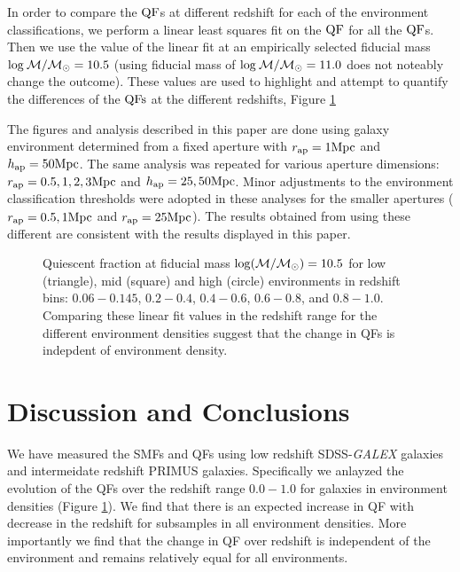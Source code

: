 \documentclass{emulateapj}
\begin{document}
In order to compare the $\rm{QF}$s at different redshift for each of the environment classifications, we perform a linear least squares fit on the $\rm{QF}$ for all the $\rm{QF}$s. 
Then we use the value of the linear fit at an empirically selected fiducial mass $\rm{log} \: \mathcal{M}/\mathcal{M}_{\odot} = 10.5$ (using fiducial mass of $\rm{log} \: \mathcal{M}/
\mathcal{M}_\odot = 11.0$ does not noteably change the outcome).
These values are used to highlight and attempt to quantify the differences of the $\rm{QFs}$ at the different redshifts, Figure \ref{fig:qf}

The figures and analysis described in this paper are done using galaxy environment determined from a fixed aperture with $r_{\rm{ap}} = 1 \rm{Mpc}$ and $h_{\rm{ap}} = 50 \rm{Mpc}$.
The same analysis was repeated for various aperture dimensions: $r_{\rm{ap}} = 0.5, 1, 2, 3 \rm{Mpc}$ and $h_{\rm{ap}} = 25, 50 \rm{Mpc}$. 
Minor adjustments to the environment classification thresholds were adopted in these analyses for the smaller apertures ($r_{\rm{ap}} = 0.5, 1 \rm{Mpc}$ and $r_{\rm{ap}} = 25 \rm{Mpc}$).
The results obtained from using these different are consistent with the results displayed in this paper. 
\begin{figure}
    \begin{center}
        \leavevmode
        \label{fig:qf}
        \caption{Quiescent fraction at fiducial mass $\rm{log} (\mathcal{M}/\mathcal{M}_{\odot}) = 10.5$ for low (triangle), mid (square) and high (circle) environments in redshift bins: $0.06-0.145$, $0.2-0.4$, $0.4-0.6$, $0.6-0.8$, and $0.8-1.0$. Comparing these linear fit values in the redshift range for the different environment densities suggest that the change in QFs is indepdent of environment density.}
    \end{center}
\end{figure}

\section{Discussion and Conclusions}
We have measured the SMFs and QFs using low redshift SDSS-{\em GALEX} galaxies and intermeidate redshift PRIMUS galaxies. 
Specifically we anlayzed the evolution of the QFs over the redshift range $0.0-1.0$ for galaxies in environment densities (Figure \ref{fig:qf}). 
We find that there is an expected increase in QF with decrease in the redshift for subsamples in all environment densities.
More importantly we find that the change in QF over redshift is independent of the environment and remains relatively equal for all environments. 
\end{document}

